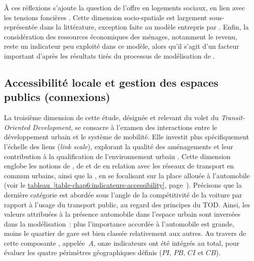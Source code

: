 \begin{refsegment}
À ces réflexions s'ajoute la question de l'offre en logements sociaux, en lien avec les tensions foncières \textcolor{blue}{\autocite[27]{singh_measuring_2015}}. Cette dimension socio-spatiale est largement sous-représentée dans la littérature, exception faite au modèle entrepris par \textcolor{blue}{\textcite[2]{zhou_introducing_2023}}. Enfin, la considération des ressources économiques des ménages, notamment le revenu, reste un indicateur peu exploité dans ce modèle, alors qu'il s'agit d'un facteur important d'après les résultats tirés du processus de modélisation de \textcolor{blue}{\textcite[3]{cummings_does_2022}}.%

\subsection{Accessibilité locale et gestion des espaces publics (connexions)
    \label{chap6:methodologie-indicateurs-accessibility}
    }

La troisième dimension de cette étude, désignée  et relevant du volet  du \textsl{Transit-Oriented Development}, se consacre à l'examen des interactions entre le développement urbain et le système de mobilité. Elle investit plus spécifiquement l'échelle des liens (\textsl{link scale}), explorant la qualité des aménagements et leur contribution à la qualification de l'environnement urbain \textcolor{blue}{\autocite[294]{zhang_built_2023}}. Cette dimension englobe les notions de , de  et de  en relation avec les réseaux de transport en commun urbains, ainsi que la , en se focalisant sur la place allouée à l'automobile (voir le \hyperref[table-chap6:indicateurs-accessibility]{tableau~\ref{table-chap6:indicateurs-accessibility}}, page~\pageref{table-chap6:indicateurs-accessibility}). Précisons que la dernière catégorie est abordée sous l'angle de la compétitivité de la voiture par rapport à l'usage du transport public, au regard des principes du \acrshort{TOD}. Ainsi, les valeurs attribuées à la présence automobile dans l'espace urbain sont inversées dans la modélisation~: plus l'importance accordée à l'automobile est grande, moins le quartier de gare est bien classée relativement aux autres. Au travers de cette composante , appelée~\(A\), onze indicateurs ont été intégrés au total, pour évaluer les quatre périmètres géographiques définis (\(PI\), \(PB\), \(CI\) et \(CB\)).%


\end{refsegment}

